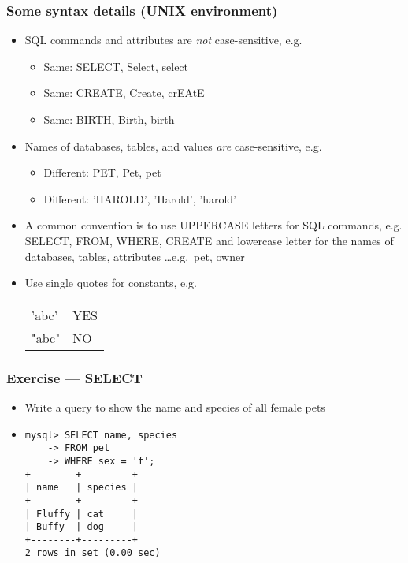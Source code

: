 \documentclass[hyperref={pdfpagelabels=false},svgnames,xcolor=table]{beamer}
\begin{document}
\begin{frame}
  \frametitle{Some syntax details (UNIX environment)}
  \begin{itemize}
    \item SQL commands and attributes are \emph{not} case-sensitive, e.g.\ 
      \begin{itemize}
        \item Same: SELECT, Select, select
        \item Same: CREATE, Create, crEAtE
        \item Same: BIRTH, Birth, birth
      \end{itemize}
    \item Names of databases, tables, and values \emph{are} case-sensitive, 
      e.g.\ 
      \begin{itemize}
        \item Different: PET, Pet, pet
        \item Different: 'HAROLD', 'Harold', 'harold'
      \end{itemize}
    \item A common convention is to use UPPERCASE letters for SQL commands,
      e.g. SELECT, FROM, WHERE, CREATE and lowercase letter for the names
      of databases, tables, attributes \ldots e.g.\ pet, owner
    \item Use single quotes for constants, e.g.\ \\
      \begin{tabular}{ll}
        'abc' & YES \\
        "abc" & NO
      \end{tabular}
  \end{itemize}
\end{frame}

\begin{frame}[fragile]
  \frametitle{Exercise --- SELECT}
  \begin{itemize}
    \item Write a query to show the name and species of all female pets
    \item<2-> 
\begin{verbatim}
mysql> SELECT name, species
    -> FROM pet
    -> WHERE sex = 'f';
+--------+---------+
| name   | species |
+--------+---------+
| Fluffy | cat     |
| Buffy  | dog     |
+--------+---------+
2 rows in set (0.00 sec)
\end{verbatim}
  \end{itemize}
\end{frame}
\end{document}
